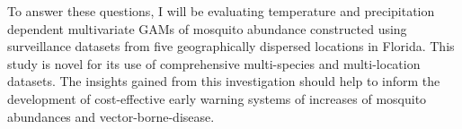 To answer these questions, I will be evaluating temperature and precipitation dependent multivariate GAMs of mosquito abundance constructed using surveillance datasets from five geographically dispersed locations in Florida. This study is novel for its use of comprehensive multi-species and multi-location datasets. The insights gained from this investigation should help to inform the development of cost-effective early warning systems of increases of mosquito abundances and vector-borne-disease. 





